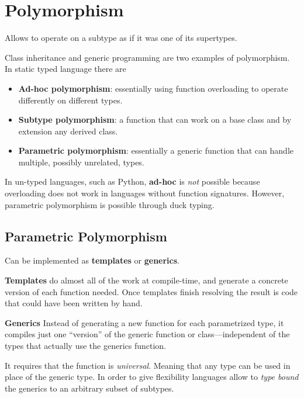 \section{Polymorphism}
Allows to operate on a subtype as if it was one of its supertypes.

Class inheritance and generic programming are two examples of
polymorphism. In static typed language there are
\begin{itemize}
  \item \textbf{Ad-hoc polymorphism}: essentially using function
  overloading to operate differently on different types.
  \item \textbf{Subtype polymorphism}: a function that can work on a
  base class and by extension any derived class.
  \item \textbf{Parametric polymorphism}: essentially a generic function
  that can handle multiple, possibly unrelated, types.
\end{itemize}

In un-typed languages, such as Python, \textbf{ad-hoc} is \textit{not}
possible because overloading does not work in languages without function
signatures. However, parametric polymorphism is possible through duck
typing.

\subsection*{Parametric Polymorphism}
Can be implemented as \textbf{templates} or \textbf{generics}.

\textbf{Templates} do almost all of the work at compile-time, and
generate a concrete version of each function needed. Once templates
finish resolving the result is code that could have been written by
hand.

\textbf{Generics} Instead of generating a new function for each
parametrized type, it compiles just one ``version'' of the generic
function or class---independent of the types that actually use the
generics function.

It requires that the function is \textit{universal}. Meaning that any
type can be used in place of the generic type. In order to give
flexibility languages allow to \textit{type bound} the generics to an
arbitrary subset of subtypes.
